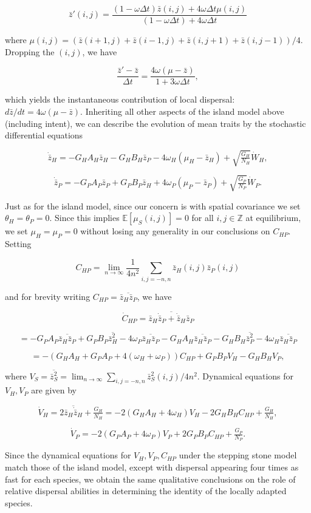 \documentclass{article}
\begin{document}
\[\bar z'(i,j)=\frac{(1-\omega\Delta t)\bar z(i,j)+4\omega\Delta t\mu(i,j)}{(1-\omega\Delta t)+4\omega\Delta t}\]

where
\(\mu(i,j)=(\bar z(i+1,j)+\bar z(i-1,j)+\bar z(i,j+1)+\bar z(i,j-1))/4\).
Dropping the \((i,j)\), we have

\[\frac{\bar z'-\bar z}{\Delta t}=\frac{4\omega(\mu-\bar z)}{1+3\omega\Delta t},\]

which yields the instantaneous contribution of local dispersal:
\(d\bar z/dt=4\omega(\mu-\bar z)\). Inheriting all other aspects of the
island model above (including intent), we can describe the evolution of
mean traits by the stochastic differential equations

\[\dot{\bar z}_H=-G_HA_H\bar z_H-G_HB_H\bar z_P-4\omega_H(\mu_H-\bar z_H)+\sqrt{\tfrac{G_H}{N_H}}\dot W_H,\]

\[\dot{\bar z}_P=-G_PA_P\bar z_P+G_PB_P\bar z_H+4\omega_P(\mu_P-\bar z_P)+\sqrt{\tfrac{G_P}{N_P}}\dot W_P.\]

Just as for the island model, since our concern is with spatial
covariance we set \(\theta_H=\theta_P=0\). Since this implies
\(\mathbb E[\mu_S(i,j)]=0\) for all \(i,j\in\mathbb Z\) at equilibrium,
we set \(\mu_H=\mu_P=0\) without losing any generality in our
conclusions on \(C_{HP}\). Setting

\[C_{HP}=\lim_{n\to\infty}\frac{1}{4n^2}\sum_{i,j=-n,n}\bar z_H(i,j)\bar z_P(i,j)\]

and for brevity writing \(C_{HP}=\overline{\bar z_H\bar z_P}\), we have

\[\dot C_{HP}=\overline{\bar z_H\dot{\bar z}_P+\dot{\bar z}_H\bar z_P}\]

\[=-G_PA_P\overline{\bar z_H\bar z_P}+G_PB_P\overline{\bar z_H^2}-4\omega_P\overline{\bar z_H\bar z_P}-G_HA_H\overline{\bar z_H\bar z_P}-G_HB_H\overline{\bar z_P^2}-4\omega_H\overline{\bar z_H\bar z_P}\]

\[=-(G_HA_H+G_PA_P+4(\omega_H+\omega_P))C_{HP}+G_PB_PV_H-G_HB_HV_P,\]

where
\(V_S=\overline{\bar z_S^2}=\lim_{n\to\infty}\sum_{i,j=-n,n}\bar z_S^2(i,j)/4n^2\).
Dynamical equations for \(V_H,V_P\) are given by

\[\dot V_H=2\overline{\bar z_H\dot{\bar z}_H}+\tfrac{G_H}{N_H}=-2(G_HA_H+4\omega_H)V_H-2G_HB_HC_{HP}+\tfrac{G_H}{N_H},\]

\[\dot V_P=-2(G_PA_P+4\omega_P)V_P+2G_PB_PC_{HP}+\tfrac{G_P}{N_P}.\]

Since the dynamical equations for \(V_H,V_P,C_{HP}\) under the stepping
stone model match those of the island model, except with dispersal
appearing four times as fast for each species, we obtain the same
qualitative conclusions on the role of relative dispersal abilities in
determining the identity of the locally adapted species.
\end{document}
